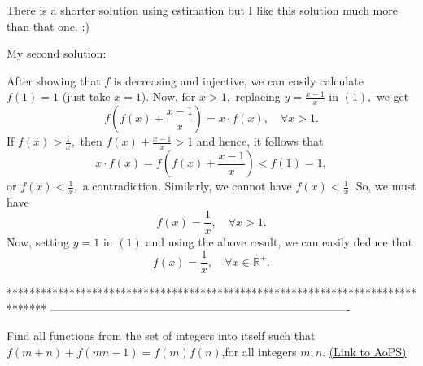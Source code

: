 \begin{solution}
There is a shorter solution using estimation but I like this solution much more than that one. :)
\end{solution}



\begin{solution}
	My second solution:

After showing that $f $ is decreasing and injective, we can easily calculate $f(1)=1$ (just take $x=1$). Now, for $x>1,$ replacing $y=\frac{x-1}{x}$ in $(1),$ we get \[f\left(f(x)+\frac{x-1}{x}\right)=x\cdot f(x),\quad \forall x >1.\] If $f(x)>\frac{1}{x},$ then $f(x)+\frac{x-1}{x}>1$ and hence, it follows that \[x\cdot f(x)=f\left(f(x)+\frac{x-1}{x}\right)<f(1)=1,\] or $f(x)<\frac{1}{x},$ a contradiction. Similarly, we cannot have $f(x)<\frac{1}{x}.$ So, we must have \[f(x)=\frac{1}{x},\quad \forall x>1.\] Now, setting $y=1$ in $(1)$ and using the above result, we can easily deduce that \[f(x)=\frac{1}{x},\quad \forall x \in \mathbb R^+.\]
\end{solution}
*******************************************************************************
-------------------------------------------------------------------------------

\begin{problem}
	Find all functions from the set of integers into itself such that $ f(m+n)+f(mn-1)=f(m)f(n) $,for all integers $m,n$.
	\flushright \href{https://artofproblemsolving.com/community/c6h534092}{(Link to AoPS)}
\end{problem}



